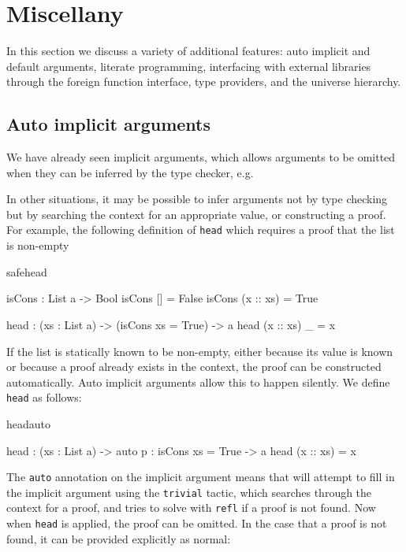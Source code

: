 \section{Miscellany}

In this section we discuss a variety of additional features:
auto implicit and default 
arguments, literate programming, interfacing with external libraries through the
foreign function interface, type providers, and the universe hierarchy.

\subsection{Auto implicit arguments}

We have already seen implicit arguments, which allows arguments to be omitted when
they can be inferred by the type checker, e.g.


\noindent
In other situations, it may be possible to infer arguments not by type checking but
by searching the context for an appropriate value, or constructing a proof. For example,
the following definition of \texttt{head} which requires a proof that the list is
non-empty

\begin{SaveVerbatim}{safehead}

isCons : List a -> Bool
isCons [] = False
isCons (x :: xs) = True

head : (xs : List a) -> (isCons xs = True) -> a
head (x :: xs) _ = x

\end{SaveVerbatim}

\noindent
If the list is statically known to be non-empty, either because its value is known or
because a proof already exists in the context, the proof can be constructed
automatically. Auto implicit arguments allow this to happen silently. We define
\texttt{head} as follows:

\begin{SaveVerbatim}{headauto}

head : (xs : List a) -> {auto p : isCons xs = True} -> a
head (x :: xs) = x

\end{SaveVerbatim}

\noindent
The \texttt{auto} annotation on the implicit argument means that \Idris{} will
attempt to fill in the implicit argument using the \texttt{trivial} tactic, which
searches through the context for a proof, and tries to solve with \texttt{refl}
if a proof is not found.
Now when \texttt{head} is applied, the proof can be omitted. In the case that a proof
is not found, it can be provided explicitly as normal:

